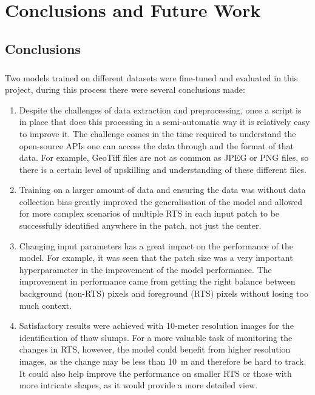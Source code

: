 \chapter{Conclusions and Future Work}
\section{Conclusions}
\paragraph{}
Two models trained on different datasets were fine-tuned and evaluated in this project, during this process there were several conclusions made:
\begin{enumerate}
    \item{Despite the challenges of data extraction and preprocessing, once a script is in place that does this processing in a semi-automatic way it is relatively easy to improve it. The challenge comes in the time required to understand the open-source \gls{API}s one can access the data through and the format of that data. For example, GeoTiff files are not as common as JPEG or PNG files, so there is a certain level of upskilling and understanding of these different files.}
    \item{Training on a larger amount of data and ensuring the data was without data collection bias greatly improved the generalisation of the model and allowed for more complex scenarios of multiple \gls{RTS} in each input patch to be successfully identified anywhere in the patch, not just the center.}
    \item{Changing input parameters has a great impact on the performance of the model. For example, it was seen that the patch size was a very important hyperparameter in the improvement of the model performance. The improvement in performance came from getting the right balance between background (non-\gls{RTS}) pixels and foreground (\gls{RTS}) pixels without losing too much context.}
    \item{Satisfactory results were achieved with 10-meter resolution images for the identification of thaw slumps. For a more valuable task of monitoring the changes in \gls{RTS}, however, the model could benefit from higher resolution images, as the change may be less than \SI{10}{\metre} and therefore be hard to track. It could also help improve the performance on smaller \gls{RTS} or those with more intricate shapes, as it would provide a more detailed view.}

\end{enumerate}
